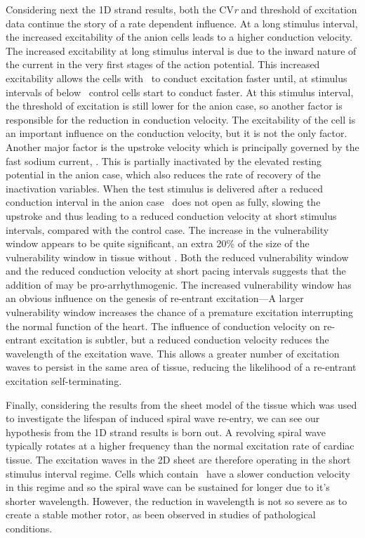 Considering next the 1D strand results, both the CV\emph{r} and threshold of
excitation data continue the story of a rate dependent influence.  At a long
stimulus interval, the increased excitability of the anion cells leads to a
higher conduction velocity.  The increased excitability at long stimulus
interval is due to the inward nature of the current in the very first stages of
the action potential.  This increased excitability allows the cells with
\ to conduct excitation faster until, at stimulus intervals of below
\ control cells start to conduct faster.  At this stimulus interval, the
threshold of excitation is still lower for the anion case, so another factor is
responsible for the reduction in conduction velocity.  The excitability of the
cell is an important influence on the conduction velocity, but it is not the
only factor.  Another major factor is the upstroke velocity which is principally
governed by the fast sodium current, .  This is partially inactivated by
the elevated resting potential in the anion case, which also reduces the rate of
recovery of the inactivation variables.  When the test stimulus is delivered
after a reduced conduction interval in the anion case \ does not open as
fully, slowing the upstroke and thus leading to a reduced conduction velocity at
short stimulus intervals, compared with the control case.  The increase in the
vulnerability window appears to be quite significant, an extra 20\% of the size
of the vulnerability window in tissue without .  Both the reduced
vulnerability window and the reduced conduction velocity at short pacing
intervals suggests that the addition of  may be pro-arrhythmogenic.
The increased vulnerability window has an obvious influence on the genesis of
re-entrant excitation---A larger vulnerability window increases the chance of a
premature excitation interrupting the normal function of the heart.  The
influence of conduction velocity on re-entrant excitation is subtler, but a
reduced conduction velocity reduces the wavelength of the excitation wave.  This
allows a greater number of excitation waves to persist in the same area of
tissue, reducing the likelihood of a re-entrant excitation self-terminating.

Finally, considering the results from the sheet model of the tissue which was
used to investigate the lifespan of induced spiral wave re-entry, we can see our
hypothesis from the 1D strand results is born out.  A revolving spiral wave
typically rotates at a higher frequency than the normal excitation rate of
cardiac tissue.  The excitation waves in the 2D sheet are therefore operating in
the short stimulus interval regime.  Cells which contain \ have a
slower conduction velocity in this regime and so the spiral wave can be
sustained for longer due to it's shorter wavelength.  However, the reduction in
wavelength is not so severe as to create a stable mother rotor, as been observed
in studies of pathological conditions.

